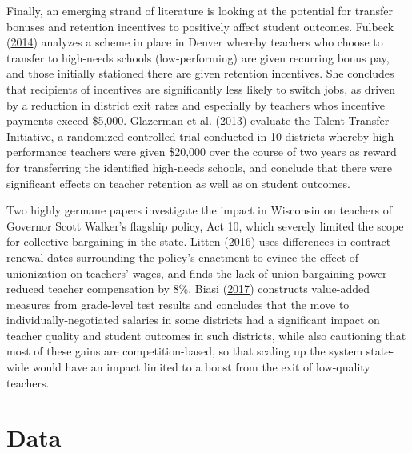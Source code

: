 \documentclass[12pt,]{article}
\begin{document}
Finally, an emerging strand of literature is looking at the potential
for transfer bonuses and retention incentives to positively affect
student outcomes. Fulbeck (\protect\hyperlink{ref-fulbeck}{2014})
analyzes a scheme in place in Denver whereby teachers who choose to
transfer to high-needs schools (low-performing) are given recurring
bonus pay, and those initially stationed there are given retention
incentives. She concludes that recipients of incentives are
significantly less likely to switch jobs, as driven by a reduction in
district exit rates and especially by teachers whos incentive payments
exceed \$5,000. Glazerman et al.
(\protect\hyperlink{ref-glazerman}{2013}) evaluate the Talent Transfer
Initiative, a randomized controlled trial conducted in 10 districts
whereby high-performance teachers were given \$20,000 over the course of
two years as reward for transferring the identified high-needs schools,
and conclude that there were significant effects on teacher retention as
well as on student outcomes.

Two highly germane papers investigate the impact in Wisconsin on
teachers of Governor Scott Walker's flagship policy, Act 10, which
severely limited the scope for collective bargaining in the state.
Litten (\protect\hyperlink{ref-litten}{2016}) uses differences in
contract renewal dates surrounding the policy's enactment to evince the
effect of unionization on teachers' wages, and finds the lack of union
bargaining power reduced teacher compensation by 8\%. Biasi
(\protect\hyperlink{ref-biasi}{2017}) constructs value-added measures
from grade-level test results and concludes that the move to
individually-negotiated salaries in some districts had a significant
impact on teacher quality and student outcomes in such districts, while
also cautioning that most of these gains are competition-based, so that
scaling up the system state-wide would have an impact limited to a boost
from the exit of low-quality teachers.

\section{Data}\label{data}
\end{document}
